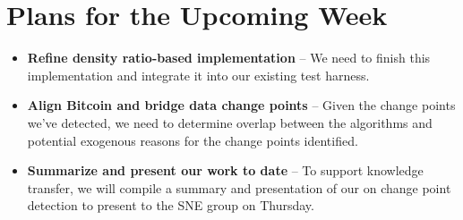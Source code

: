 \documentclass[10pt,letterpaper]{article}
\begin{document}
\section{Plans for the Upcoming Week}

\begin{itemize}
\item \textbf{Refine density ratio-based implementation} -- We need to finish this implementation and integrate it into our existing test harness.
\item \textbf{Align Bitcoin and bridge data change points} -- Given the change points we've detected, we need to determine overlap between the algorithms and potential exogenous reasons for the change points identified.
\item \textbf{Summarize and present our work to date} -- To support knowledge transfer, we will compile a summary and presentation of our on change point detection to present to the SNE group on Thursday.
\end{itemize}

%
%
\end{document}
